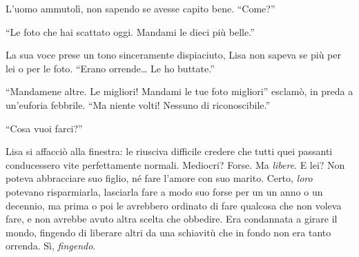 \documentclass[a4paper,oneside,11pt]{memoir}
\begin{document}
L'uomo ammutolì, non sapendo se avesse capito bene. ``Come?''

``Le foto che hai scattato oggi. Mandami le dieci più belle.''

La sua voce prese un tono sinceramente dispiaciuto, Lisa non sapeva se più per
lei o per le foto. ``Erano orrende\dots{} Le ho buttate.''

``Mandamene altre. Le migliori! Mandami le tue foto migliori'' esclamò, in preda
a un'euforia febbrile. ``Ma niente volti! Nessuno di riconoscibile.''

``Cosa vuoi farci?''


Lisa si affacciò alla finestra: le riusciva difficile credere che tutti quei
passanti conducessero vite perfettamente normali. Mediocri? Forse. Ma
\emph{libere}. E lei? Non poteva abbracciare suo figlio, né fare l'amore con suo
marito. Certo, \emph{loro} potevano risparmiarla, lasciarla fare a modo suo
forse per un un anno o un decennio, ma prima o poi le avrebbero ordinato di fare
qualcosa che non voleva fare, e non avrebbe avuto altra scelta che obbedire. Era
condannata a girare il mondo, fingendo di liberare altri da una schiavitù che in
fondo non era tanto orrenda. Sì, \emph{fingendo}.
\end{document}
